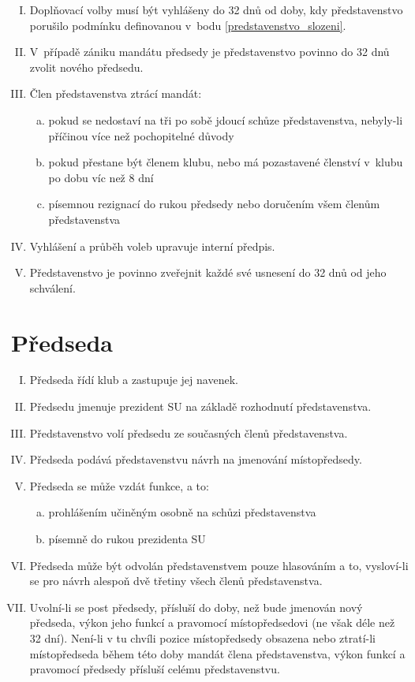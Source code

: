 \documentclass[10pt]{article}
\begin{document}
\begin{enumerate}[I.]
	\item Doplňovací volby musí být vyhlášeny do 32 dnů od doby, kdy představenstvo porušilo podmínku definovanou v~bodu \ref{predstavenstvo_slozeni}.
	\item V~případě zániku mandátu předsedy je představenstvo povinno do 32 dnů zvolit nového předsedu.
	\item Člen představenstva ztrácí mandát:
		\begin{enumerate}[a.]
		\item pokud se nedostaví na tři po sobě jdoucí schůze představenstva, nebyly-li příčinou více než pochopitelné důvody
		\item pokud přestane být členem klubu, nebo má pozastavené členství v~klubu po dobu víc než 8 dní
		\item písemnou rezignací do rukou předsedy nebo doručením všem členům představenstva
		\end{enumerate}
	\item Vyhlášení a průběh voleb upravuje interní předpis. 
	\item Představenstvo je povinno zveřejnit každé své usnesení do 32 dnů od jeho schválení.
	\end{enumerate}

\section{Předseda} %
	\begin{enumerate}[I.]
	\item Předseda řídí klub a zastupuje jej navenek.  
	\item Předsedu jmenuje prezident SU na základě rozhodnutí představenstva.
	\item Představenstvo volí předsedu ze současných členů představenstva.
	\item Předseda podává představenstvu návrh na jmenování místopředsedy.
	\item Předseda se může vzdát funkce, a to:  
		\begin{enumerate}[a.]
		\item prohlášením učiněným osobně na schůzi představenstva
		\item písemně do rukou prezidenta SU  
		\end{enumerate}
	\item Předseda může být odvolán představenstvem pouze hlasováním a to, vysloví-li se pro návrh alespoň dvě třetiny všech členů představenstva. 
	\item Uvolní-li se post předsedy, přísluší do doby, než bude jmenován nový předseda, výkon jeho funkcí a pravomocí místopředsedovi (ne však déle než 32 dní). Není-li v tu chvíli pozice místopředsedy obsazena nebo ztratí-li místopředseda během této doby mandát člena představenstva, výkon funkcí a pravomocí předsedy přísluší celému představenstvu.
	\end{enumerate}
\end{document}
